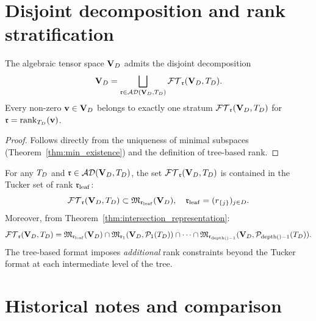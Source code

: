 \section{Disjoint decomposition and rank stratification}
\label{sec:algTBT:stratification}

\begin{theorem}
\label{thm:TBT_decomposition}
The algebraic tensor space $\mathbf{V}_D$ admits the disjoint decomposition
\begin{equation}
\label{eq:TBT_disjoint}
    \mathbf{V}_D = \bigsqcup_{\mathfrak{r} \in \mathcal{AD}(\mathbf{V}_D,T_D)} \mathcal{FT}_{\mathfrak{r}}(\mathbf{V}_D,T_D).
\end{equation}
Every non-zero $\mathbf{v} \in \mathbf{V}_D$ belongs to exactly one stratum
$\mathcal{FT}_{\mathfrak{r}}(\mathbf{V}_D,T_D)$ for $\mathfrak{r} = \mathrm{rank}_{T_D}(\mathbf{v})$.
\end{theorem}

\begin{proof}
Follows directly from the uniqueness of minimal subspaces
(Theorem~\ref{thm:min_existence}) and the definition of tree-based rank.
\end{proof}

\begin{proposition}
\label{prop:TBT_tucker_relation}
For any $T_D$ and $\mathfrak{r} \in \mathcal{AD}(\mathbf{V}_D,T_D)$, the set $\mathcal{FT}_{\mathfrak{r}}(\mathbf{V}_D,T_D)$ is contained in the
Tucker set of rank $\mathfrak{r}_{\mathrm{leaf}}$:
\begin{equation*}
    \mathcal{FT}_{\mathfrak{r}}(\mathbf{V}_D,T_D) \subset \mathfrak{M}_{\mathfrak{r}_\mathrm{leaf}}(\mathbf{V}_D),
    \quad
    \mathfrak{r}_\mathrm{leaf} = (r_{\{j\}})_{j \in D}.
\end{equation*}
Moreover, from Theorem~\ref{thm:intersection_representation}:
\begin{equation*}
    \mathcal{FT}_{\mathfrak{r}}(\mathbf{V}_D,T_D) = \mathfrak{M}_{\mathfrak{r}_\mathrm{leaf}}(\mathbf{V}_D)
    \cap \mathfrak{M}_{\mathfrak{r}_1}(\mathbf{V}_D, \mathcal{P}_1(T_D))
    \cap \cdots \cap
    \mathfrak{M}_{\mathfrak{r}_{\mathrm{depth}()-1}}(\mathbf{V}_D, \mathcal{P}_{\mathrm{depth}()-1}(T_D)).
\end{equation*}
The tree-based format imposes \emph{additional} rank constraints beyond
the Tucker format at each intermediate level of the tree.
\end{proposition}

\section{Historical notes and comparison}
\label{sec:algTBT:history}

